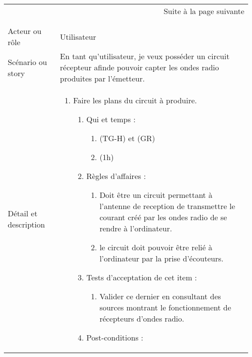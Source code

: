 \begin{longtable}{|l|p{}|}
\multicolumn{2}{r}{Suite à la page suivante} \\
\endfoot

\multicolumn{2}{r}{} \\
\endlastfoot

\hline
    \rowcolor{Gray}
    \multicolumn{2}{|l|}{1} \\
\hline
    Acteur ou rôle & Utilisateur \\
\hline
    Scénario ou story & En tant qu’utilisateur, je veux posséder un circuit
    récepteur afinde pouvoir capter les ondes radio produites par l’émetteur. \\
\hline
    Détail et description &
        \begin{enumerate}[label*=\arabic*.]
        \item Faire les plans du circuit à produire.
            \begin{enumerate}[label*=\arabic*.]
                    \item Qui et temps :
                    \begin{enumerate}[label*=\arabic*.]
                        \item (TG-H) et (GR)
                        \item (1h)
                    \end{enumerate}
                    \item Règles d’affaires :
                    \begin{enumerate}[label*=\arabic*.]
                        \item Doit être un circuit permettant à l'antenne de reception de transmettre le courant créé par les ondes radio de se rendre à l'ordinateur.
                        \item le circuit doit pouvoir être relié à l'ordinateur par la prise d'écouteurs.
                    \end{enumerate}
                    \item Tests d'acceptation de cet item :
                    \begin{enumerate}[label*=\arabic*.]
                        \item Valider ce dernier en consultant des sources montrant le fonctionnement de récepteurs d'ondes radio. 
                    \end{enumerate}
                    \item Post-conditions :
                    \begin{enumerate}[label*=\arabic*.]

\end{enumerate}
\end{enumerate}
\end{enumerate}
\end{longtable}
